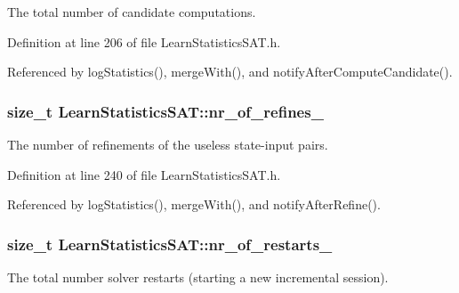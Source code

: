 The total number of candidate computations. 



Definition at line 206 of file Learn\-Statistics\-S\-A\-T.\-h.



Referenced by log\-Statistics(), merge\-With(), and notify\-After\-Compute\-Candidate().

\hypertarget{classLearnStatisticsSAT_afa9b3c4bb24e7f6ebd9593dfb916c11e}{
\subsubsection[{nr\-\_\-of\-\_\-refines\-\_\-}]{\setlength{\rightskip}{0pt plus 5cm}size\-\_\-t Learn\-Statistics\-S\-A\-T\-::nr\-\_\-of\-\_\-refines\-\_\-\hspace{0.3cm}{\ttfamily [protected]}}}\label{classLearnStatisticsSAT_afa9b3c4bb24e7f6ebd9593dfb916c11e}


The number of refinements of the useless state-\/input pairs. 



Definition at line 240 of file Learn\-Statistics\-S\-A\-T.\-h.



Referenced by log\-Statistics(), merge\-With(), and notify\-After\-Refine().

\hypertarget{classLearnStatisticsSAT_a07c8eee4a3c82762e3a94e38440f3adb}{
\subsubsection[{nr\-\_\-of\-\_\-restarts\-\_\-}]{\setlength{\rightskip}{0pt plus 5cm}size\-\_\-t Learn\-Statistics\-S\-A\-T\-::nr\-\_\-of\-\_\-restarts\-\_\-\hspace{0.3cm}{\ttfamily [protected]}}}\label{classLearnStatisticsSAT_a07c8eee4a3c82762e3a94e38440f3adb}


The total number solver restarts (starting a new incremental session). 



